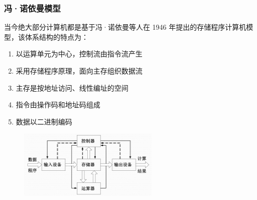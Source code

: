 \documentclass[cs4size,a4paper,10pt]{ctexart}
\begin{document}
	
	\subsubsection{冯·诺依曼模型}
	当今绝大部分计算机都是基于冯·诺依曼等人在 1946 年提出的存储程序计算机模型，该体系结构的特点为：
	\begin{enumerate}[label=\arabic*.]
		\item 以运算单元为中心，控制流由指令流产生
		\item 采用存储程序原理，面向主存组织数据流
		\item 主存是按地址访问、线性编址的空间
		\item 指令由操作码和地址码组成
		\item 数据以二进制编码
	\end{enumerate}
	\begin{figure}[H]
		\centering
		\includegraphics[width=0.6\textwidth]{img/1.1.2.2}
	\end{figure}
\end{document}
